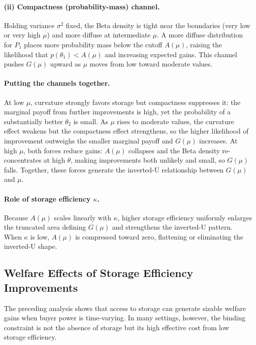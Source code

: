 \paragraph{(ii) Compactness (probability-mass) channel.}
Holding variance $\sigma^2$ fixed, the Beta density is tight near the boundaries (very low or very high $\mu$) and more diffuse at intermediate $\mu$. A more diffuse distribution for $P_1$ places more probability mass below the cutoff $A(\mu)$, raising the likelihood that $p(\theta_1)<A(\mu)$ and increasing expected gains. This channel pushes $G(\mu)$ upward as $\mu$ moves from low toward moderate values.

\paragraph{Putting the channels together.}
At low $\mu$, curvature strongly favors storage but compactness suppresses it: the marginal payoff from further improvements is high, yet the probability of a substantially better $\theta_2$ is small. As $\mu$ rises to moderate values, the curvature effect weakens but the compactness effect strengthens, so the higher likelihood of improvement outweighs the smaller marginal payoff and $G(\mu)$ increases. At high $\mu$, both forces reduce gains: $A(\mu)$ collapses and the Beta density re-concentrates at high $\theta$, making improvements both unlikely and small, so $G(\mu)$ falls. Together, these forces generate the inverted-U relationship between $G(\mu)$ and $\mu$.

\paragraph{Role of storage efficiency $\kappa$.}
Because $A(\mu)$ scales linearly with $\kappa$, higher storage efficiency uniformly enlarges the truncated area defining $G(\mu)$ and strengthens the inverted-U pattern. When $\kappa$ is low, $A(\mu)$ is compressed toward zero, flattening or eliminating the inverted-U shape.





\subsection{Welfare Effects of Storage Efficiency Improvements}
\noindent 
The preceding analysis shows that access to storage can generate sizable welfare gains when buyer power is time-varying. In many settings, however, the binding constraint is not the absence of storage but its high effective cost from low storage efficiency.

